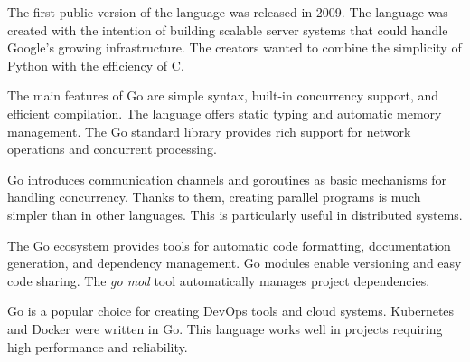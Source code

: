 The first public version of the language was released in 2009.
The language was created with the intention of building scalable server systems that could handle Google's growing infrastructure.
The creators wanted to combine the simplicity of Python with the efficiency of C.

The main features of Go are simple syntax, built-in concurrency support, and efficient compilation.
The language offers static typing and automatic memory management.
The Go standard library provides rich support for network operations and concurrent processing.

Go introduces communication channels and goroutines as basic mechanisms for handling concurrency.
Thanks to them, creating parallel programs is much simpler than in other languages.
This is particularly useful in distributed systems.

The Go ecosystem provides tools for automatic code formatting, documentation generation, and dependency management.
Go modules enable versioning and easy code sharing.
The \textit{go mod} tool automatically manages project dependencies.

Go is a popular choice for creating DevOps tools and cloud systems.
Kubernetes and Docker were written in Go. This language works well in projects requiring high performance and reliability.